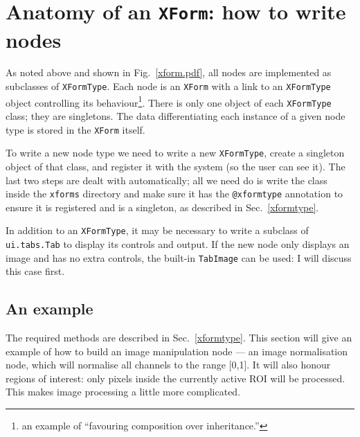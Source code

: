 

\section{Anatomy of an \texttt{XForm}: how to write nodes}
As noted above and shown in Fig.~\ref{xform.pdf}, all nodes are 
implemented as subclasses of \texttt{XFormType}. Each node 
is an \texttt{XForm} with a link to an \texttt{XFormType} object
controlling its behaviour\footnote{an example of ``favouring
composition over inheritance.''}.
There is only one object of each \texttt{XFormType} class; they
are singletons. The data differentiating each instance of 
a given node type is stored in the \texttt{XForm} itself.

To write a new node type we need to write a new \texttt{XFormType},
create a singleton object of that class, and register it with the system
(so the user can see it). The last two steps are dealt with automatically;
all we need do is write the class inside the \texttt{xforms} directory
and make sure it has the \texttt{@xformtype} annotation to ensure
it is registered and is a singleton, as described in 
Sec.~\ref{xformtype}.

In addition to an \texttt{XFormType}, it may be necessary to write
a subclass of \texttt{ui.tabs.Tab} to display its controls and output.
If the new node only displays
an image and has no extra controls, the built-in \texttt{TabImage}
can be used: I will discuss this case first.

\subsection{An example}
The required methods are described in Sec.~\ref{xformtype}. This
section will give an example of how to build an image manipulation
node --- an image normalisation node, which will normalise all channels
to the range [0,1]. It will also honour regions of interest:
only pixels inside the currently active ROI will be processed. This makes
image processing a little more complicated.


